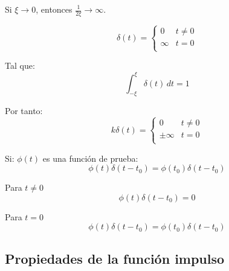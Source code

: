 Si $\xi\to0$, entonces $\frac{1}{2\xi}\to\infty$.
\begin{figure}[H]
    \centering
    
\end{figure}
\begin{equation*}
    \delta(t)=\begin{cases}
        0&t\neq0\\
        \infty&t=0\\
    \end{cases}
\end{equation*}

Tal que:
\begin{equation*}
    \int_{-\xi}^{\xi}\delta(t)\,dt=1
\end{equation*}

Por tanto:
\begin{equation}
    k\delta(t)=\begin{cases}
        0&t\neq0\\
        \pm\infty&t=0\\
    \end{cases}
\end{equation}
\begin{figure}[H]
    \centering
    \begin{minipage}{.4\textwidth}
        \centering
        
    \end{minipage}
    \begin{minipage}{.4\textwidth}
        \centering
        
    \end{minipage}
\end{figure}

Si: $\phi(t)$ es una función de prueba:
\begin{equation}
    \phi(t)\delta(t-t_0)=\phi(t_0)\delta(t-t_0)
\end{equation}
\begin{figure}[H]
    \centering
    
\end{figure}

Para $t\neq0$
\begin{equation*}
    \phi(t)\delta(t-t_0)=0
\end{equation*}

Para $t=0$
\begin{equation*}
    \phi(t)\delta(t-t_0)=\phi(t_0)\delta(t-t_0)
\end{equation*}

\subsection{Propiedades de la función impulso}
